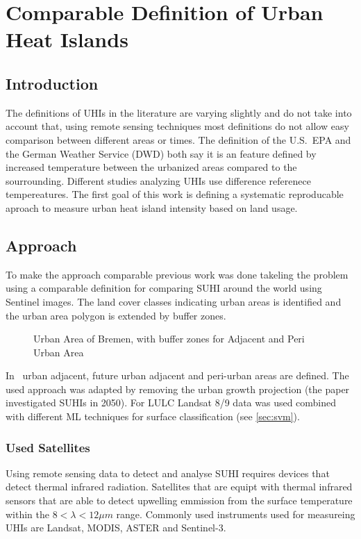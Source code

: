 \documentclass[a4paper, english]{article}
\begin{document}
\section{Comparable Definition of Urban Heat Islands}
    \subsection{Introduction}
    The definitions of \glspl{UHI} in the literature are varying slightly and do not take into account that, using remote sensing techniques most definitions do not allow easy comparison between different areas or times.
    The definition of the U.S.~EPA\cite{EPA2008} and the German Weather Service (DWD) both say it is an feature defined by increased temperature between the urbanized areas compared to the sourrounding. %
    Different studies analyzing \glspl{UHI} use difference referenece tempereatures.
    The first goal of this work is defining a systematic reproducable aproach to measure urban heat island intensity based on land usage.

    \subsection{Approach}
    To make the approach comparable previous work was done takeling the problem using a comparable definition for comparing \gls{SUHI} around the world using Sentinel images\cite{Sobrino2020}.
    The land cover classes indicating urban areas is identified and the urban area polygon is extended by buffer zones. 
    \begin{figure}
      
      \caption{Urban Area of Bremen, with buffer zones for Adjacent and Peri Urban Area}
    \end{figure}
    In~\cite{Sobrino2020} urban adjacent, future urban adjacent and peri-urban areas are defined.
    The used approach was adapted by removing the urban growth projection (the paper investigated \glspl{SUHI} in 2050).
    For \gls{LULC} Landsat 8/9 data was used combined with different \gls{ML} techniques for surface classification (see \cref{sec:svm}). %

    
    \subsubsection{Used Satellites}
    Using remote sensing data to detect and analyse \gls{SUHI} requires devices that detect thermal infrared radiation. 
    Satellites that are equipt with thermal infrared sensors that are able to detect upwelling emmission from the surface temperature within the $ 8 < \lambda < 12 \mu m $ range. 
    Commonly used instruments used for measureing UHIs are Landsat, MODIS, ASTER and Sentinel-3. 
    
\end{document}
